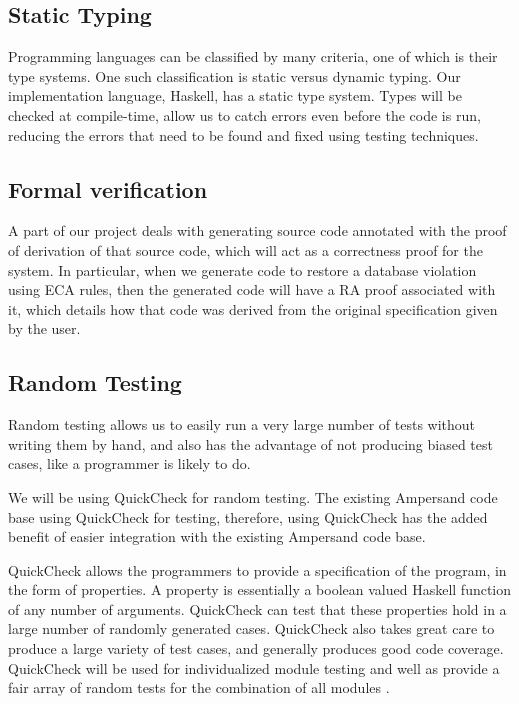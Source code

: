 \documentclass[12pt]{report}
\begin{document}

\subsection{Static Typing}\label{subsec:Static}
Programming languages can be classified by many criteria, one of which is their
type systems. One such classification is static versus dynamic typing. Our
implementation language, Haskell, has a static type system. Types will be
checked at compile-time, allow us to catch errors even before the code is run,
reducing the errors that need to be found and fixed using testing techniques. 

\subsection{Formal verification}\label{subsec:FormalVer}
A part of our project deals with generating source code annotated with the proof
of derivation of that source code, which will act as a correctness proof for the
system. In particular, when we generate code to restore a database violation
using ECA rules, then the generated code will have a RA proof associated with it,
which details how that code was derived from the original specification given by
the user.

\subsection{Random Testing}\label{subsec:RandTest}
Random testing allows us to easily run a very large number of tests without
writing them by hand, and also has the advantage of not producing biased test
cases, like a programmer is likely to do.

We will be using QuickCheck \cite{hackage} for random testing. The existing 
Ampersand code base
using QuickCheck for testing, therefore, using QuickCheck has the added benefit
of easier integration with the existing Ampersand code base.

QuickCheck allows the programmers to provide a specification of the program, in
the form of properties. A property is essentially a boolean valued Haskell
function of any number of arguments. QuickCheck can test that these properties
hold in a large number of randomly generated cases. QuickCheck also takes great
care to produce a large variety of test cases, and generally produces good code
coverage. QuickCheck will be used for individualized module testing and well as 
provide a fair array of random tests for the combination of all modules 
\cite{hackage}.
\end{document}
